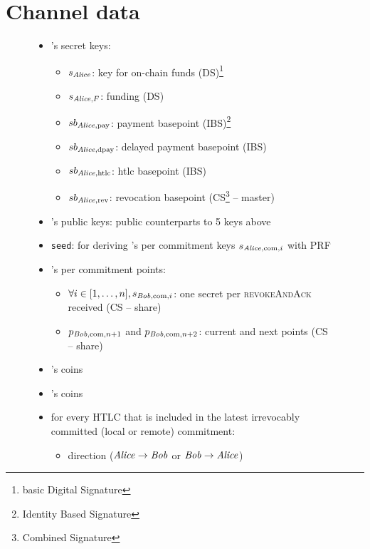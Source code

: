 \section{Channel data}
  \label{sec:channel-data}
  \begin{figure}[H]
  \begin{mdframed}
    \begin{itemize}
      \item \alice's secret keys:
      \begin{itemize}
        \item $s_{\mathit{Alice}}$: key for on-chain funds (DS)\footnote{basic Digital
        Signature}
        \item $s_{\mathit{Alice}, F}$: funding (DS)
        \item $sb_{\mathit{Alice}, \mathrm{pay}}$: payment basepoint
        (IBS)\footnote{Identity Based Signature}
        \item $sb_{\mathit{Alice}, \mathrm{dpay}}$: delayed payment basepoint (IBS)
        \item $sb_{\mathit{Alice}, \mathrm{htlc}}$: htlc basepoint (IBS)
        \item $sb_{\mathit{Alice}, \mathrm{rev}}$: revocation basepoint
        (CS\footnote{Combined Signature} -- master)
      \end{itemize}
      \item \bob's public keys: public counterparts to 5 keys above
      \item \texttt{seed}: for deriving \alice's per commitment keys $s_{\mathit{Alice},
      \mathrm{com}, i}$ with PRF
      \item \bob's per commitment points:
      \begin{itemize}
        \item $\forall i \in [1, \dots, n], s_{\mathit{Bob}, \mathrm{com}, i}$: one
        secret per \textsc{revokeAndAck} received (CS -- share)
        \item $p_{\mathit{Bob}, \mathrm{com}, n+1}$ and $p_{\mathit{Bob}, \mathrm{com}, n+2}$:
        current and next points (CS -- share)
      \end{itemize}
      \item \alice's coins
      \item \bob's coins
      \item for every HTLC that is included in the latest irrevocably committed
      (local or remote) commitment:
        \begin{itemize}
          \item direction ($\mathit{Alice} \rightarrow \mathit{Bob}$ or $\mathit{Bob} \rightarrow \mathit{Alice}$)

\end{itemize}
\end{itemize}
\end{mdframed}
\end{figure}
